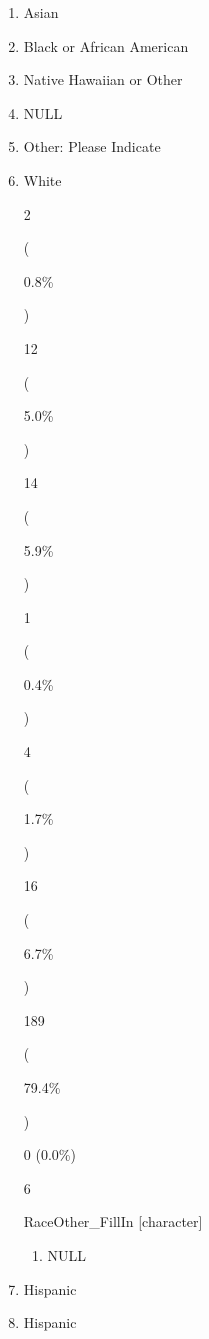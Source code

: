 \documentclass[]{article}
\providecommand{\tightlist}{%
  \setlength{\itemsep}{0pt}\setlength{\parskip}{0pt}}
\begin{document}
\begin{enumerate}
  3

  (

  1.3\%

  )

  0 (0.0\%)

  5

  Race {[}character{]}

  \begin{enumerate}
  \def\labelenumii{\arabic{enumii}.}
  \tightlist
  \item
    American Indian / Alaska
  \end{enumerate}
\item
  Asian
\item
  Black or African American
\item
  Native Hawaiian or Other
\item
  NULL
\item
  Other: Please Indicate
\item
  White

  2

  (

  0.8\%

  )

  12

  (

  5.0\%

  )

  14

  (

  5.9\%

  )

  1

  (

  0.4\%

  )

  4

  (

  1.7\%

  )

  16

  (

  6.7\%

  )

  189

  (

  79.4\%

  )

  0 (0.0\%)

  6

  RaceOther\_FillIn {[}character{]}

  \begin{enumerate}
  \def\labelenumii{\arabic{enumii}.}
  \tightlist
  \item
    NULL
  \end{enumerate}
\item
  Hispanic
\item
  Hispanic 


\end{enumerate}
\end{document}
